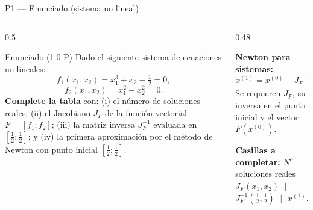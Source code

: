 \documentclass[aspectratio=169,10pt]{beamer}
\begin{document}
\begin{frame}{P1 — Enunciado (sistema no lineal)}
\begin{columns}[T]
\begin{column}{0.5\textwidth}
\begin{cardidea}{Enunciado \textmd{\small(1.0 P)}}{\faQuestionCircle}
{\footnotesize Dado el siguiente sistema de ecuaciones no lineales:
\[
f_1(x_1,x_2)=x_1^{3}+x_2-\tfrac12=0,
\]
\[
f_2(x_1,x_2)=x_1^{2}-x_2^{2}=0.
\]
\textbf{Complete la tabla} con: (i) el número de soluciones reales; (ii) el Jacobiano $J_F$ de la función vectorial $F=[f_1;f_2]$; (iii) la matriz inversa $J_F^{-1}$ evaluada en $[\tfrac12;\tfrac12]$; y (iv) la primera aproximación por el método de Newton con punto inicial $[\tfrac12;\tfrac12]$.}
\end{cardidea}
\end{column}
\begin{column}{0.48\textwidth}
\begin{cardnota}[\faInfoCircle]
{\footnotesize \textbf{Newton para sistemas:}
\[
x^{(1)}=x^{(0)}-J_F^{-1}(x^{(0)})\,F(x^{(0)}).
\]
Se requieren $J_F$, su inversa en el punto inicial y el vector $F(x^{(0)})$.}
\end{cardnota}
\vspace{1mm}
\begin{cardnota}[\faTable]
{\footnotesize \textbf{Casillas a completar:} $N^{\!o}$ soluciones reales $\;\vert\;$ $J_F(x_1,x_2)$ $\;\vert\;$ $J_F^{-1}(\tfrac12,\tfrac12)$ $\;\vert\;$ $x^{(1)}$.}
\end{cardnota}
\end{column}
\end{columns}
\end{frame}
\end{document}
